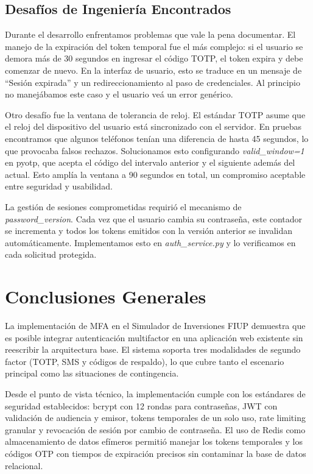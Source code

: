 \documentclass[12pt,letterpaper]{article}
\begin{document}
\subsection{Desaf\'ios de Ingenier\'ia Encontrados}

Durante el desarrollo enfrentamos problemas que vale la pena documentar. El manejo de la expiraci\'on del token temporal fue el m\'as complejo: si el usuario se demora m\'as de 30 segundos en ingresar el c\'odigo TOTP, el token expira y debe comenzar de nuevo. En la interfaz de usuario, esto se traduce en un mensaje de ``Sesi\'on expirada'' y un redireccionamiento al paso de credenciales. Al principio no manej\'abamos este caso y el usuario ve\'a un error gen\'erico.

Otro desaf\'io fue la ventana de tolerancia de reloj. El est\'andar TOTP asume que el reloj del dispositivo del usuario est\'a sincronizado con el servidor. En pruebas encontramos que algunos tel\'efonos ten\'ian una diferencia de hasta 45 segundos, lo que provocaba falsos rechazos. Solucionamos esto configurando \textit{valid\_window=1} en pyotp, que acepta el c\'odigo del intervalo anterior y el siguiente adem\'as del actual. Esto ampl\'ia la ventana a 90 segundos en total, un compromiso aceptable entre seguridad y usabilidad.

La gesti\'on de sesiones comprometidas requiri\'o el mecanismo de \textit{password\_version}. Cada vez que el usuario cambia su contrase\~na, este contador se incrementa y todos los tokens emitidos con la versi\'on anterior se invalidan autom\'aticamente. Implementamos esto en \textit{auth\_service.py} y lo verificamos en cada solicitud protegida.

\section{Conclusiones Generales}

La implementaci\'on de MFA en el Simulador de Inversiones FIUP demuestra que es posible integrar autenticaci\'on multifactor en una aplicaci\'on web existente sin reescribir la arquitectura base. El sistema soporta tres modalidades de segundo factor (TOTP, SMS y c\'odigos de respaldo), lo que cubre tanto el escenario principal como las situaciones de contingencia.

Desde el punto de vista t\'ecnico, la implementaci\'on cumple con los est\'andares de seguridad establecidos: bcrypt con 12 rondas para contrase\~nas, JWT con validaci\'on de audiencia y emisor, tokens temporales de un solo uso, rate limiting granular y revocaci\'on de sesi\'on por cambio de contrase\~na. El uso de Redis como almacenamiento de datos ef\'imeros permiti\'o manejar los tokens temporales y los c\'odigos OTP con tiempos de expiraci\'on precisos sin contaminar la base de datos relacional.
\end{document}
